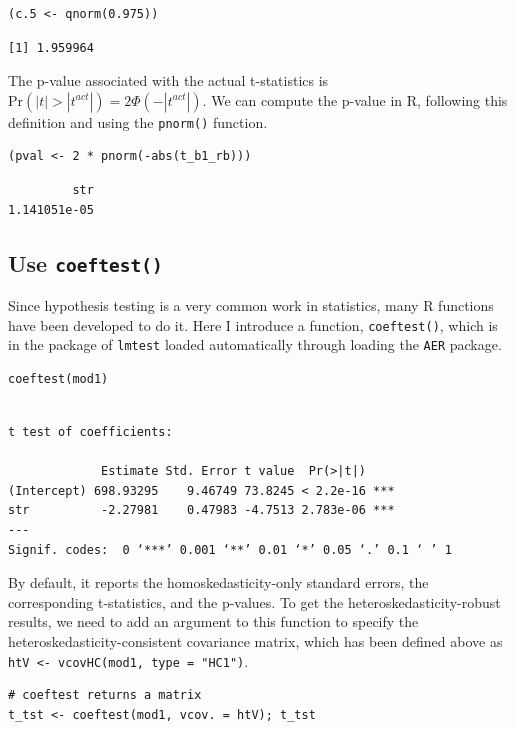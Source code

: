 \documentclass[11pt]{article}
\begin{document}
\begin{verbatim}
(c.5 <- qnorm(0.975))
\end{verbatim}

\begin{verbatim}
[1] 1.959964
\end{verbatim}

The p-value associated with the actual t-statistics is
\(\mathrm{Pr}\left(|t| > |t^{act}| \right) = 2 \Phi(-|t^{act}|)\). We can
compute the p-value in R, following this definition and using the
\texttt{pnorm()} function.

\begin{verbatim}
(pval <- 2 * pnorm(-abs(t_b1_rb)))
\end{verbatim}

\begin{verbatim}
         str
1.141051e-05
\end{verbatim}


\subsection*{Use \texttt{coeftest()}}
\label{sec:orga2838d3}

Since hypothesis testing is a very common work in statistics, many R
functions have been developed to do it. Here I introduce a function,
\texttt{coeftest()}, which is in the package of \texttt{lmtest} loaded automatically
through loading the \texttt{AER} package.

\begin{verbatim}
coeftest(mod1)
\end{verbatim}

\begin{verbatim}

t test of coefficients:

             Estimate Std. Error t value  Pr(>|t|)
(Intercept) 698.93295    9.46749 73.8245 < 2.2e-16 ***
str          -2.27981    0.47983 -4.7513 2.783e-06 ***
---
Signif. codes:  0 ‘***’ 0.001 ‘**’ 0.01 ‘*’ 0.05 ‘.’ 0.1 ‘ ’ 1
\end{verbatim}

By default, it reports the homoskedasticity-only standard errors,
the corresponding t-statistics, and the p-values. To get the
heteroskedasticity-robust results, we need to add an argument to this
function to specify the heteroskedasticity-consistent covariance
matrix, which has been defined above as \texttt{htV <- vcovHC(mod1, type = "HC1")}.

\begin{verbatim}
# coeftest returns a matrix
t_tst <- coeftest(mod1, vcov. = htV); t_tst
\end{verbatim}
\end{document}
